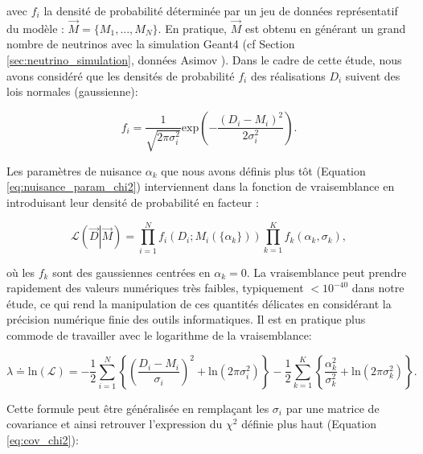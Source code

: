 \bigbreak

avec $f_i$ la densité de probabilité déterminée par un jeu de données représentatif du modèle : $\overrightarrow{M} = \{ M_1, ..., M_N \}$. En pratique, $\overrightarrow{M}$ est obtenu en générant un grand nombre de neutrinos avec la simulation Geant4 (cf Section \ref{sec:neutrino_simulation}, \og données Asimov \fg{}). Dans le cadre de cette étude, nous avons considéré que les densités de probabilité $f_i$ des réalisations $D_i$ suivent des lois normales (gaussienne):

\begin{equation}
    f_i = \frac{1}{\sqrt{2\pi \sigma_i^2}} \textrm{exp} \left( - \frac{(D_i - M_i)^2}{2\sigma_i^2} \right).
\end{equation}

\bigbreak

Les paramètres de nuisance $\alpha_k$ que nous avons définis plus tôt (Equation \ref{eq:nuisance_param_chi2}) interviennent dans la fonction de vraisemblance en introduisant leur densité de probabilité en facteur :

\begin{equation}
    \mathcal{L}\left(\overrightarrow{D} \left| \overrightarrow{M} \right. \right) = \prod_{i=1}^{N} f_i(D_i; M_i(\{\alpha_k\})) \prod_{k=1}^{K} f_k(\alpha_k, \sigma_k),
\end{equation}



\bigbreak

où les $f_k$ sont des gaussiennes centrées en $\alpha_k = 0$. La vraisemblance peut prendre rapidement des valeurs numériques très faibles, typiquement $< 10^{-40}$ dans notre étude, ce qui rend la manipulation de ces quantités délicates en considérant la précision numérique finie des outils informatiques. Il est en pratique plus commode de travailler avec le logarithme de la vraisemblance:

\begin{equation}
    \lambda \doteq \textrm{ln}(\mathcal{L}) = -\frac{1}{2} \sum_{i=1}^{N} \left\{ \left( \frac{D_i - M_i}{\sigma_i} \right)^2 + \textrm{ln}(2\pi \sigma_i^2) \right\} - \frac{1}{2} \sum_{k=1}^K \left\{ \frac{\alpha_k^2}{\sigma_k^2}  + \textrm{ln}(2\pi \sigma_k^2) \right\} .
\end{equation}

\bigbreak

Cette formule peut être généralisée en remplaçant les $\sigma_i$ par une matrice de covariance et ainsi retrouver l'expression du $\chi^2$ définie plus haut (Equation \ref{eq:cov_chi2}):

